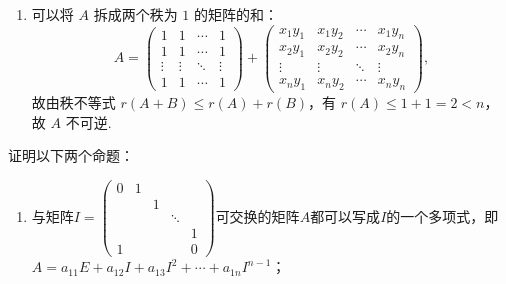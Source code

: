 \begin{exercise}
\begin{exgroup}
\begin{answer}
\begin{enumerate}
                \item 可以将 $A$ 拆成两个秩为 $1$ 的矩阵的和：
                    \[
                        A = \begin{pmatrix}
                            1      & 1      & \cdots & 1      \\
                            1      & 1      & \cdots & 1      \\
                            \vdots & \vdots & \ddots & \vdots \\
                            1      & 1      & \cdots & 1
                        \end{pmatrix} + \begin{pmatrix}
                            x_1 y_1 & x_1 y_2 & \cdots & x_1 y_n \\
                            x_2 y_1 & x_2 y_2 & \cdots & x_2 y_n \\
                            \vdots  & \vdots  & \ddots & \vdots  \\
                            x_n y_1 & x_n y_2 & \cdots & x_n y_n
                        \end{pmatrix},
                    \]
                    故由秩不等式 $r(A+B) \leqslant r(A)+r(B)$，有 $r(A) \leqslant 1 + 1 = 2 < n$，故 $A$ 不可逆.
            \end{enumerate}
        \end{answer}

        \item 证明以下两个命题：
        \begin{enumerate}
            \item 与矩阵$I=\begin{pmatrix}
                          0 & 1 &   &        &   \\
                            &   & 1 &        &   \\
                            &   &   & \ddots &   \\
                            &   &   &        & 1 \\
                          1 &   &   &        & 0
                      \end{pmatrix}$可交换的矩阵$A$都可以写成$I$的一个多项式，即$A=a_{11}E+a_{12}I+a_{13}I^2+\cdots+a_{1n}I^{n-1}$；


\end{enumerate}
\end{exgroup}
\end{exercise}
